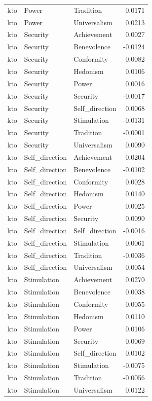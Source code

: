 \begin{tabular}{lllr}
kto & Power & Tradition & 0.0171 \\
kto & Power & Universalism & 0.0213 \\
kto & Security & Achievement & 0.0027 \\
kto & Security & Benevolence & -0.0124 \\
kto & Security & Conformity & 0.0082 \\
kto & Security & Hedonism & 0.0106 \\
kto & Security & Power & 0.0016 \\
kto & Security & Security & -0.0017 \\
kto & Security & Self\_direction & 0.0068 \\
kto & Security & Stimulation & -0.0131 \\
kto & Security & Tradition & -0.0001 \\
kto & Security & Universalism & 0.0090 \\
kto & Self\_direction & Achievement & 0.0204 \\
kto & Self\_direction & Benevolence & -0.0102 \\
kto & Self\_direction & Conformity & 0.0028 \\
kto & Self\_direction & Hedonism & 0.0140 \\
kto & Self\_direction & Power & 0.0025 \\
kto & Self\_direction & Security & 0.0090 \\
kto & Self\_direction & Self\_direction & -0.0016 \\
kto & Self\_direction & Stimulation & 0.0061 \\
kto & Self\_direction & Tradition & -0.0036 \\
kto & Self\_direction & Universalism & 0.0054 \\
kto & Stimulation & Achievement & 0.0270 \\
kto & Stimulation & Benevolence & 0.0038 \\
kto & Stimulation & Conformity & 0.0055 \\
kto & Stimulation & Hedonism & 0.0110 \\
kto & Stimulation & Power & 0.0106 \\
kto & Stimulation & Security & 0.0069 \\
kto & Stimulation & Self\_direction & 0.0102 \\
kto & Stimulation & Stimulation & -0.0075 \\
kto & Stimulation & Tradition & -0.0056 \\
kto & Stimulation & Universalism & 0.0122 \\

\end{tabular}

